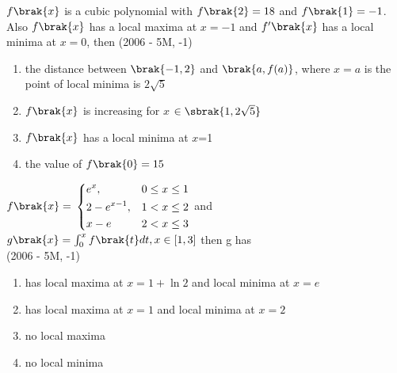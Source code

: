     \item{
        
            $f\brak{x}$ is a cubic polynomial with  $f\brak{2}=18$ and $f\brak{1}=-1$. Also $f\brak{x}$ has a local maxima at $x=-1$ and $f^{\prime}\brak{x}$ has a local minima at $x=0$, then
              \hfill
                {(2006 - 5M, -1)}
            
            \begin{enumerate}
                \item the distance between $\brak{-1,2}$ and $\brak{a,f(a)}$, where $x=a$ is the point of local minima is $2\sqrt{5}$
                \item $f\brak{x}$ is increasing for $x$ $\in \sbrak{1,2\sqrt{5}}$
                \item $f\brak{x}$ has a local minima at $x$=1
                \item the value of $f\brak{0}=15$
            \end{enumerate}
        
        }
    \item{
        
            $f\brak{x} = $    
            $\begin{dcases}%
                e^x, & 0 \leq x\leq 1 \\
                2-e^{x-1}, & 1 < x\leq 2 \\
                x-e & 2 < x\leq 3 \\
            \end{dcases}$ and $g\brak{x} = \int_0^{x}f\brak{t}dt, x \in[1,3]$ then g has
             \\ \text{   } \hfill
                {(2006 - 5M, -1)}
            
            \begin{enumerate}
                \item has local maxima at $x = 1+ \ln{2}$ and local minima at $x = e$
                \item has local maxima at $x = 1$ and local minima at $x = 2$
                \item no local maxima
                \item no local minima
            \end{enumerate}
        
        }
